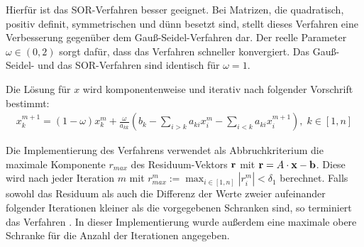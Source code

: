 Hierfür ist das \gls{SOR}-Verfahren besser geeignet. Bei Matrizen, die quadratisch, positiv definit, symmetrischen und dünn besetzt sind, stellt dieses Verfahren eine Verbesserung gegenüber dem Gauß-Seidel-Verfahren dar. Der reelle Parameter $\omega \in (0,2)$ sorgt dafür, dass das Verfahren schneller konvergiert. Das Gauß-Seidel- und das \gls{SOR}-Verfahren sind identisch für $\omega = 1 $.

Die Lösung für $x$ wird komponentenweise und iterativ nach folgender Vorschrift bestimmt:
\begin{align}
x_k^{m+1} = (1-\omega)x_k^m+ \frac{\omega}{a_{kk}}(b_k - \sum_{i>k} a_{ki}x_i^m - \sum_{i<k} a_{ki}x_{i}^{m+1}) ,\; k \in [1, n]
\end{align}

Die Implementierung des Verfahrens verwendet als Abbruchkriterium die maximale Komponente $r_{max}$ des Residuum-Vektors $\mathbf r$ mit $\mathbf r = A \cdot \mathbf x - \mathbf b$. Diese wird nach jeder Iteration $m$ mit $r_{max}^m := \max_{i\in [1,n]} |r_i^m| < \delta_1$ berechnet. Falls sowohl das Residuum  als auch die Differenz der Werte zweier aufeinander folgender Iterationen kleiner als die vorgegebenen Schranken sind, so terminiert das Verfahren \cite[S. 143]{Westermann2008}. In dieser Implementierung wurde außerdem eine maximale obere Schranke für die Anzahl der Iterationen angegeben.


